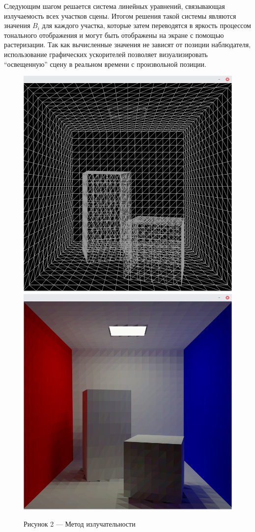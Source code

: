 \documentclass[12pt]{article}
\begin{document}
Следующим шагом решается система линейных уравнений, связывающая излучаемость всех участков сцены. Итогом решения такой системы являются значения $B_i$ для каждого участка, которые затем переводятся в яркость процессом тонального отображения и могут быть отображены на экране с помощью растеризации. Так как вычисленные значения не зависят от позиции наблюдателя, использование графических ускорителей позволяет визуализировать ``освещенную'' сцену в реальном времени с произвольной позиции.
\begin{figure}[h]
\centering
\includegraphics[scale=0.3]{rad_input.png}
\includegraphics[scale=0.3]{rad_output.png}
\caption*{Рисунок 2 --- Метод излучательности}
\end{figure}
\end{document}
